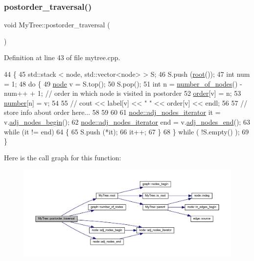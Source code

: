 \subsubsection{\texorpdfstring{postorder\+\_\+traversal()}{postorder\_traversal()}}
{\footnotesize\ttfamily void My\+Tree\+::postorder\+\_\+traversal (\begin{DoxyParamCaption}{ }\end{DoxyParamCaption})}



Definition at line 43 of file mytree.\+cpp.


\begin{DoxyCode}
44 \{ 
45     std::stack < node, std::vector<node> > S;
46     S.push (\mbox{\hyperlink{class_my_tree_a04b0f390bb74c3bdb157cad08872076e}{root}}());
47     \textcolor{keywordtype}{int} num = 1;
48     \textcolor{keywordflow}{do} \{
49         \mbox{\hyperlink{classnode}{node}} v = S.top();
50         S.pop();
51         \textcolor{keywordtype}{int} n = \mbox{\hyperlink{classgraph_a42c78e0a9f115655e3ff0efe35ebfc4e}{number\_of\_nodes}}() - num++ + 1; \textcolor{comment}{// order in which node is visited in
       postorder}
52         \mbox{\hyperlink{class_my_tree_afbd5fcfe2a1033b7b440bb2fcf55bb21}{order}}[v] = n; 
53         \mbox{\hyperlink{class_my_tree_a307b02f445704719cfbc4229690e20d7}{number}}[n] = v;
54 
55 \textcolor{comment}{//      cout << label[v] << " " << order[v] << endl;}
56         
57         \textcolor{comment}{// store info about order here...}
58         
59         
60         
61         \mbox{\hyperlink{classnode_a392f19ea6dfa344bdf5c4d5a4b25eb8c}{node::adj\_nodes\_iterator}} it = v.\mbox{\hyperlink{classnode_a6cd2febf910bc6572c4aecba6278b100}{adj\_nodes\_begin}}();
62         \mbox{\hyperlink{classnode_a392f19ea6dfa344bdf5c4d5a4b25eb8c}{node::adj\_nodes\_iterator}} end = v.\mbox{\hyperlink{classnode_a2477fa92c56a19d29464082444a3043a}{adj\_nodes\_end}}();
63         \textcolor{keywordflow}{while} (it != end)
64         \{
65             S.push (*it);
66             it++;
67         \}
68     \} \textcolor{keywordflow}{while} ( !S.empty() );
69 \}
\end{DoxyCode}
Here is the call graph for this function\+:\nopagebreak
\begin{figure}[H]
\begin{center}
\leavevmode
\includegraphics[width=350pt]{class_my_tree_ac375615ebccedd180aee25c5ea3f8ef1_cgraph}
\end{center}
\end{figure}
